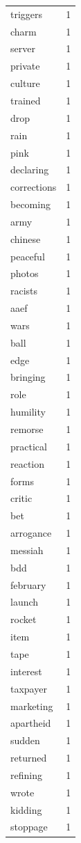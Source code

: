 \begin{tabular}{lr}
triggers & 1 \\
charm & 1 \\
server & 1 \\
private & 1 \\
culture & 1 \\
trained & 1 \\
drop & 1 \\
rain & 1 \\
pink & 1 \\
declaring & 1 \\
corrections & 1 \\
becoming & 1 \\
army & 1 \\
chinese & 1 \\
peaceful & 1 \\
photos & 1 \\
racists & 1 \\
aaef & 1 \\
wars & 1 \\
ball & 1 \\
edge & 1 \\
bringing & 1 \\
role & 1 \\
humility & 1 \\
remorse & 1 \\
practical & 1 \\
reaction & 1 \\
forms & 1 \\
critic & 1 \\
bet & 1 \\
arrogance & 1 \\
messiah & 1 \\
bdd & 1 \\
february & 1 \\
launch & 1 \\
rocket & 1 \\
item & 1 \\
tape & 1 \\
interest & 1 \\
taxpayer & 1 \\
marketing & 1 \\
apartheid & 1 \\
sudden & 1 \\
returned & 1 \\
refining & 1 \\
wrote & 1 \\
kidding & 1 \\
stoppage & 1 \\

\end{tabular}
